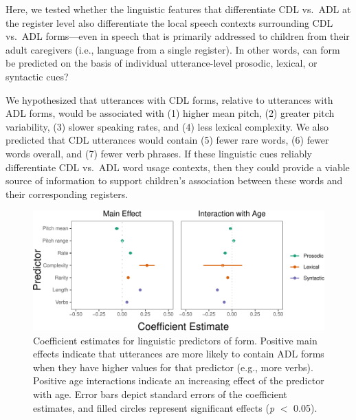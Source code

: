 \documentclass[10pt, letterpaper]{article}
\newenvironment{CodeChunk}{}{}
\begin{document}
Here, we tested whether the linguistic features that differentiate CDL
vs.~ADL at the register level also differentiate the local speech
contexts surrounding CDL vs.~ADL forms---even in speech that is
primarily addressed to children from their adult caregivers (i.e.,
language from a single register). In other words, can form be predicted
on the basis of individual utterance-level prosodic, lexical, or
syntactic cues?

We hypothesized that utterances with CDL forms, relative to utterances
with ADL forms, would be associated with (1) higher mean pitch, (2)
greater pitch variability, (3) slower speaking rates, and (4) less
lexical complexity. We also predicted that CDL utterances would contain
(5) fewer rare words, (6) fewer words overall, and (7) fewer verb
phrases. If these linguistic cues reliably differentiate CDL vs.~ADL
word usage contexts, then they could provide a viable source of
information to support children's association between these words and
their corresponding registers.

\begin{CodeChunk}
\begin{figure}[h]

{\centering \includegraphics{figs/ling-predictors-fig-1} 

}

\caption[Coefficient estimates for linguistic predictors of form]{Coefficient estimates for linguistic predictors of form. Positive main effects indicate that utterances are more likely to contain ADL forms when they have higher values for that predictor (e.g., more verbs). Positive age interactions indicate an increasing effect of the predictor with age. Error bars depict standard errors of the coefficient estimates, and filled circles represent significant effects (\textit{p} $<$ 0.05).}\label{fig:ling-predictors-fig}
\end{figure}
\end{CodeChunk}
\end{document}
